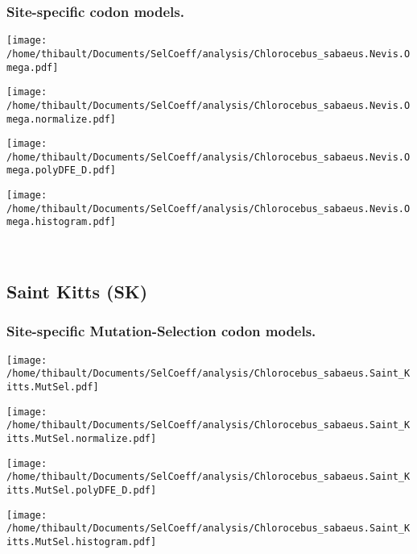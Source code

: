 \subsubsection*{Site-specific codon models.} 
\begin{minipage}{0.49\linewidth} 
\texttt{[image: /home/thibault/Documents/SelCoeff/analysis/Chlorocebus\_sabaeus.Nevis.Omega.pdf]} 
\end{minipage}
\begin{minipage}{0.49\linewidth} 
\texttt{[image: /home/thibault/Documents/SelCoeff/analysis/Chlorocebus\_sabaeus.Nevis.Omega.normalize.pdf]} 
\end{minipage}
\begin{minipage}{0.49\linewidth} 
\texttt{[image: /home/thibault/Documents/SelCoeff/analysis/Chlorocebus\_sabaeus.Nevis.Omega.polyDFE\_D.pdf]} 
\end{minipage}
\begin{minipage}{0.49\linewidth} 
\texttt{[image: /home/thibault/Documents/SelCoeff/analysis/Chlorocebus\_sabaeus.Nevis.Omega.histogram.pdf]} 
\end{minipage}
\\ 
\subsection{Saint Kitts (SK)} 
 
\subsubsection*{Site-specific Mutation-Selection codon models.} 
\begin{minipage}{0.49\linewidth} 
\texttt{[image: /home/thibault/Documents/SelCoeff/analysis/Chlorocebus\_sabaeus.Saint\_Kitts.MutSel.pdf]} 
\end{minipage}
\begin{minipage}{0.49\linewidth} 
\texttt{[image: /home/thibault/Documents/SelCoeff/analysis/Chlorocebus\_sabaeus.Saint\_Kitts.MutSel.normalize.pdf]} 
\end{minipage}
\begin{minipage}{0.49\linewidth} 
\texttt{[image: /home/thibault/Documents/SelCoeff/analysis/Chlorocebus\_sabaeus.Saint\_Kitts.MutSel.polyDFE\_D.pdf]} 
\end{minipage}
\begin{minipage}{0.49\linewidth} 
\texttt{[image: /home/thibault/Documents/SelCoeff/analysis/Chlorocebus\_sabaeus.Saint\_Kitts.MutSel.histogram.pdf]} 
\end{minipage}
\\ 
